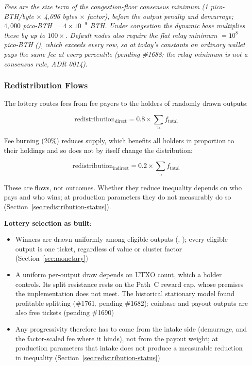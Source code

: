 \textit{Fees are the size term of the congestion-floor consensus minimum
(1 pico-BTH/byte $\times$ 4{,}096 bytes $\times$ factor), before the output
penalty and demurrage; $4{,}000$ pico-BTH $= 4\times10^{-9}$ BTH. Under
congestion the dynamic base multiplies these by up to $100\times$. Default
nodes also require the flat relay minimum  $= 10^{8}$
pico-BTH (), which exceeds every row,
so at today's constants an ordinary wallet pays the same fee at every
percentile (pending \#1688; the relay minimum is not a consensus rule, ADR 0014).}

\subsubsection{Redistribution Flows}

The lottery routes fees from fee payers to the holders of randomly drawn
outputs:

\begin{equation}
\text{redistribution}_{\text{direct}} = 0.8 \times \sum_{\text{tx}} f_{\text{total}}
\end{equation}

Fee burning (20\%) reduces supply, which benefits all holders in
proportion to their holdings and so does not by itself change the
distribution:

\begin{equation}
\text{redistribution}_{\text{indirect}} = 0.2 \times \sum_{\text{tx}} f_{\text{total}}
\end{equation}

These are flows, not outcomes. Whether they reduce inequality depends on
who pays and who wins; at production parameters they do not measurably do so
(Section~\ref{sec:redistribution-status}).

\textbf{Lottery selection as built}:
\begin{itemize}
  \item Winners are drawn uniformly among eligible outputs
    (, );
    every eligible output is one ticket, regardless of value or cluster
    factor (Section~\ref{sec:monetary})
  \item A uniform per-output draw depends on UTXO count, which a holder
    controls. Its split resistance rests on the Path~C reward cap, whose
    premises the implementation does not meet. The historical stationary
    model found profitable splitting (\#1761, pending \#1682); coinbase and payout outputs are also free
    tickets (pending \#1690)
  \item Any progressivity therefore has to come from the intake side
    (demurrage, and the factor-scaled fee where it binds), not from the
    payout weight; at production parameters that intake does not produce a
    measurable reduction in inequality
    (Section~\ref{sec:redistribution-status})
\end{itemize}

